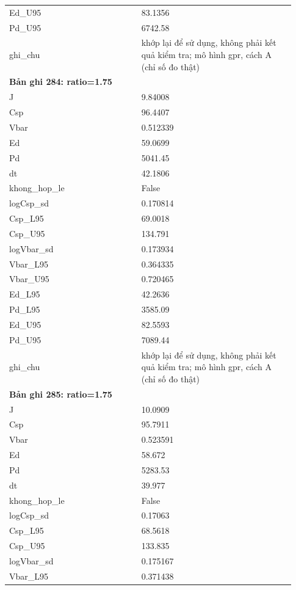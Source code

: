 \begin{longtable}{p{0.43\linewidth}p{0.50\linewidth}}
Ed\_\allowbreak U95 & 83.1356 \\
Pd\_\allowbreak U95 & 6742.58 \\
ghi\_\allowbreak chu & khớp lại để sử dụng, không phải kết quả kiểm tra; mô hình gpr, cách A (chỉ số đo thật) \\
\midrule
\multicolumn{2}{p{0.95\linewidth}}{\textbf{Bản ghi 284: ratio=1.75}} \\
J & 9.84008 \\
Csp & 96.4407 \\
Vbar & 0.512339 \\
Ed & 59.0699 \\
Pd & 5041.45 \\
dt & 42.1806 \\
khong\_\allowbreak hop\_\allowbreak le & False \\
logCsp\_\allowbreak sd & 0.170814 \\
Csp\_\allowbreak L95 & 69.0018 \\
Csp\_\allowbreak U95 & 134.791 \\
logVbar\_\allowbreak sd & 0.173934 \\
Vbar\_\allowbreak L95 & 0.364335 \\
Vbar\_\allowbreak U95 & 0.720465 \\
Ed\_\allowbreak L95 & 42.2636 \\
Pd\_\allowbreak L95 & 3585.09 \\
Ed\_\allowbreak U95 & 82.5593 \\
Pd\_\allowbreak U95 & 7089.44 \\
ghi\_\allowbreak chu & khớp lại để sử dụng, không phải kết quả kiểm tra; mô hình gpr, cách A (chỉ số đo thật) \\
\midrule
\multicolumn{2}{p{0.95\linewidth}}{\textbf{Bản ghi 285: ratio=1.75}} \\
J & 10.0909 \\
Csp & 95.7911 \\
Vbar & 0.523591 \\
Ed & 58.672 \\
Pd & 5283.53 \\
dt & 39.977 \\
khong\_\allowbreak hop\_\allowbreak le & False \\
logCsp\_\allowbreak sd & 0.17063 \\
Csp\_\allowbreak L95 & 68.5618 \\
Csp\_\allowbreak U95 & 133.835 \\
logVbar\_\allowbreak sd & 0.175167 \\
Vbar\_\allowbreak L95 & 0.371438 \\

\end{longtable}
